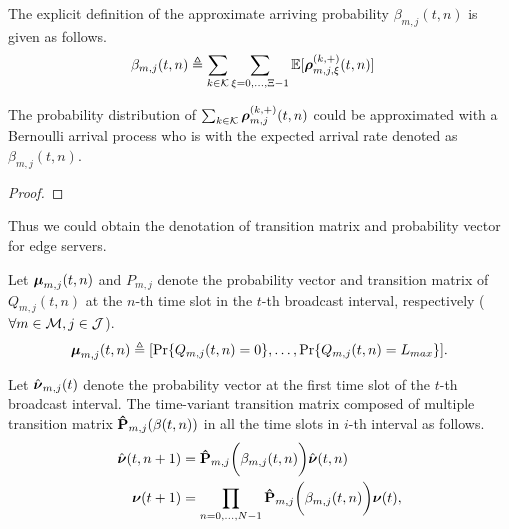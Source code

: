 The explicit definition of the approximate arriving probability $\beta_{m,j}({t,n})$ is given as follows.
\begin{align}
    {\beta}_{m,j}({t,n}) &\triangleq \sum_{k\in\mathcal{K}} \sum_{\xi=0,\dots,\Xi-1} \mathbb{E}[\boldsymbol{\rho}^{(k,+)}_{m,j,\xi}({t,n})]
    \label{eqn_0}
\end{align}
\begin{lemma}
    The probability distribution of $\sum_{k\in\mathcal{K}} \boldsymbol{\rho}^{(k,+)}_{m,j}({t,n})$ could be approximated with a Bernoulli arrival process who is with the expected arrival rate denoted as ${\beta}_{m,j}({t,n})$.
\end{lemma}
\begin{proof}
\end{proof}

Thus we could obtain the denotation of transition matrix and probability vector for edge servers.
\begin{definition}
    Let $\boldsymbol{\mu}_{m,j}(t,n)$ and $P_{m,j}$ denote the probability vector and transition matrix of $Q_{m,j}(t,n)$ at the $n$-th time slot in the $t$-th broadcast interval, respectively ($\forall m\in\mathcal{M}, j\in\mathcal{J}$).
    \begin{align}
        \boldsymbol{\mu}_{m,j}(t,n) \triangleq [\Pr\{Q_{m,j}(t,n)=0\}, \dots, \Pr\{Q_{m,j}(t,n)=L_{max}\}].
    \end{align}

    Let $\hat{\boldsymbol{\nu}}_{m,j}(t)$ denote the probability vector at the first time slot of the $t$-th broadcast interval.
    The time-variant transition matrix composed of multiple transition matrix $\mathbf{\hat{P}}_{m,j}(\beta({t,n}))$ in all the time slots in $i$-th interval as follows.
    \begin{align}
        \hat{\boldsymbol{\nu}}({t,n+1}) &= \mathbf{\hat{P}}_{m,j}\bigg(\beta_{m,j}({t,n})\bigg) \hat{\boldsymbol{\nu}}({t,n})
        \\
        \boldsymbol{\nu}(t+1) &= \prod_{n=0,\dots,N-1} \mathbf{\hat{P}}_{m,j}\bigg(\beta_{m,j}({t,n})\bigg) \boldsymbol{\nu}(t),
        \label{eqn_4}
    \end{align}
\end{definition}
